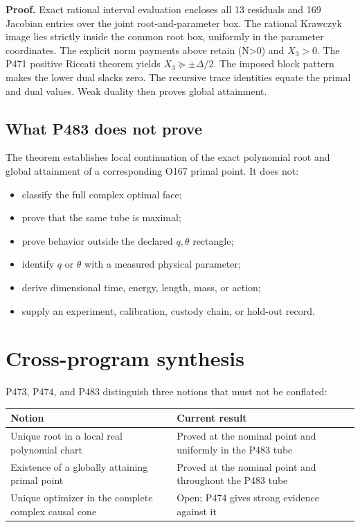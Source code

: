 \documentclass[11pt,a4paper,openany]{report}
\begin{document}
\textbf{Proof.} Exact rational interval evaluation encloses all 13 residuals and 169 Jacobian entries over the joint root-and-parameter box. The rational Krawczyk image lies strictly inside the common root box, uniformly in the parameter coordinates. The explicit norm payments above retain (N>0) and \(X_3>0\). The P471 positive Riccati theorem yields \(X_3\succeq\pm\Delta/2\). The imposed block pattern makes the lower dual slacks zero. The recursive trace identities equate the primal and dual values. Weak duality then proves global attainment.

\section{What P483 does not prove}

The theorem establishes local continuation of the exact polynomial root and global attainment of a corresponding O167 primal point. It does not:

\begin{itemize}
\item 
classify the full complex optimal face;

\item 
prove that the same tube is maximal;

\item 
prove behavior outside the declared \(q,\theta\) rectangle;

\item 
identify \(q\) or \(\theta\) with a measured physical parameter;

\item 
derive dimensional time, energy, length, mass, or action;

\item 
supply an experiment, calibration, custody chain, or hold-out record.

\end{itemize}

\chapter{Cross-program synthesis}

P473, P474, and P483 distinguish three notions that must not be conflated:

\begin{center}
\begingroup\small
\setlength{\tabcolsep}{2.5pt}
\renewcommand{\arraystretch}{1.16}
\begin{longtable}{@{}p{}p{}@{}}
\toprule
\textbf{Notion} & \textbf{Current result} \\
\midrule
\endhead
Unique root in a local real polynomial chart & Proved at the nominal point and uniformly in the P483 tube \\
Existence of a globally attaining primal point & Proved at the nominal point and throughout the P483 tube \\
Unique optimizer in the complete complex causal cone & Open; P474 gives strong evidence against it \\
\bottomrule
\end{longtable}
\endgroup
\end{center}
\end{document}
